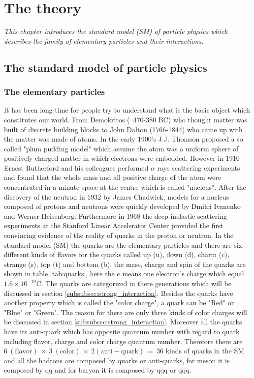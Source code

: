 \chapter{The theory}\label{chap:SM_BSM}
\textit{This chapter introduces the standard model (SM) of particle physics which describes the family of elementary particles and their interactions.}
\section{The standard model of particle physics}\label{sec:SM}
\subsection{The elementary particles}\label{subsec:elem_particle}
It has been long time for people try to understand what is the basic object which constitutes our world. From Demokritos (~470-380 BC) who thought matter was built of discrete building blocks to John Dalton (1766-1844) who came up with the matter was made of atoms. In the early 1900's J.J. Thomson proposed a so called "plum pudding model" which assume the atom was a uniform sphere of positively charged matter in which electrons were embedded. However in 1910 Ernest Rutherford and his colleagues performed $\alpha$ rays scattering experiments and found that the whole mass and all positive charge of the atom were concentrated in a minute space at the centre which is called "nucleus". After the discovery of the neutron in 1932 by James Chadwick, models for a nucleus composed of protons and neutrons were quickly developed by Dmitri Ivanenko and Werner Heisenberg. Furthermore in 1968 the deep inelastic scattering experiments at the Stanford Linear Accelerator Center provided the first convincing evidence of the reality of quarks in the proton or neutron. In the standard model (SM) the quarks are the elementary particles and there are six different kinds of flavors for the quarks called up (u), down (d), charm (c), strange (s), top (t) and bottom (b), the mass, charge and spin of the quarks are shown in table \ref{tab:quarks}, here the $e$ means one electron's charge which equal $\mathrm{1.6\times10^{-19}C}$. The quarks are categorized in there generations which will be discussed in section \ref{subsubsec:strong_interaction}. Besides the quarks have another property which is called the "color charge", a quark can be "Red" or "Blue" or "Green". The reason for there are only three kinds of color charges will be discussed in section \ref{subsubsec:strong_interaction}. Moreover all the quarks have its anti-quark which has opposite quantum number with regard to quark including flavor, charge and color charge quantum number. Therefore there are $\mathrm{6~(flavor)~\times~3~(color)~\times~2(anti-quark)~=~36}$ kinds of quarks in the SM and all the hadrons are composed by quarks or anti-quarks, for meson it is composed by $\mathrm{q\bar{q}}$ and for baryon it is composed by $\mathrm{qqq}$ or $\mathrm{\bar{q}\bar{q}\bar{q}}$.
